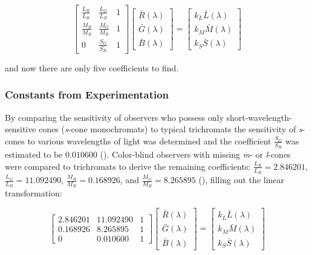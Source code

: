 \documentclass{article}
\begin{document}
\begin{multicols}{2}
\begin{equation}\label{eq:cone_fundamental_linear_transformation_symbolic_simplified} %
    \begin{bmatrix}
        \frac{L_R}{L_B}&\frac{L_G}{L_B}&1\\
        \frac{M_R}{M_B}&\frac{M_G}{M_B}&1\\
        0&\frac{S_G}{S_B}&1
    \end{bmatrix}\begin{bmatrix}
        \bar{R}(\lambda)\\
        \bar{G}(\lambda)\\
        \bar{B}(\lambda)
    \end{bmatrix}=\begin{bmatrix}
        k_L\bar{L}(\lambda)\\
        k_M\bar{M}(\lambda)\\
        k_S\bar{S}(\lambda)
    \end{bmatrix}
\end{equation}

and now there are only five coefficients to find.

\subsubsection{Constants from Experimentation} %

By comparing the sensitivity of observers who possess only short-wavelength-sensitive cones (\textit{s}-cone monochromats) to typical trichromats the sensitivity of \textit{s}-cones to various wavelengths of light was determined and the coefficient $\frac{S_G}{S_B}$ was estimated to be $0.010600$ (\cite{stockman1999spectral}).  Color-blind observers with missing \textit{m}- or \textit{l}-cones were compared to trichromats to derive the remaining coefficients: $\frac{L_R}{L_B}=2.846201$, $\frac{L_G}{L_B}=11.092490$, $\frac{M_R}{M_B}=0.168926$, and $\frac{M_G}{M_B}=8.265895$ (\cite{stockman2000spectral}), filling out the linear transformation:

\begin{equation}\label{eq:cone_fundamental_linear_transformation} %
    \begin{bmatrix}
        2.846201&11.092490&1\\
        0.168926&8.265895&1\\
        0&0.010600&1
    \end{bmatrix}\begin{bmatrix}
        \bar{R}(\lambda)\\
        \bar{G}(\lambda)\\
        \bar{B}(\lambda)
    \end{bmatrix}=\begin{bmatrix}
        k_L\bar{L}(\lambda)\\
        k_M\bar{M}(\lambda)\\
        k_S\bar{S}(\lambda)
    \end{bmatrix}
\end{equation}


\end{multicols}
\end{document}
